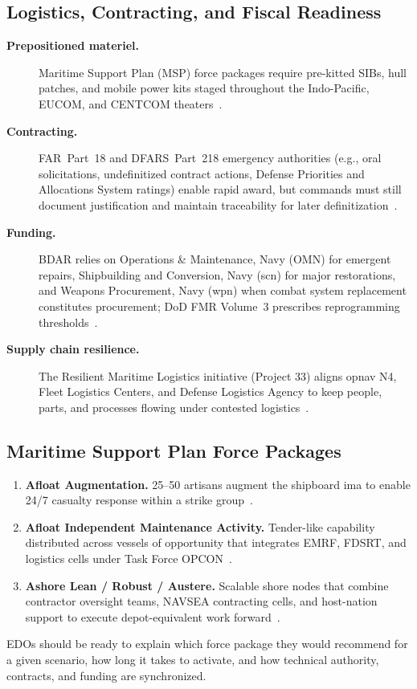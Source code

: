 \documentclass[../main.tex]{subfiles}
\begin{document}
\subsection{Logistics, Contracting, and Fiscal Readiness}
\begin{description}
\item[\textbf{Prepositioned materiel.}] Maritime Support Plan (MSP) force packages require pre-kitted SIBs, hull patches, and mobile power kits staged throughout the Indo-Pacific, EUCOM, and CENTCOM theaters~\autocite{CPF-MSP-PLANORD-2023}.
\item[\textbf{Contracting.}] FAR~Part~18 and DFARS~Part~218 emergency authorities (e.g., oral solicitations, undefinitized contract actions, Defense Priorities and Allocations System ratings) enable rapid award, but commands must still document justification and maintain traceability for later definitization~\autocite{FAR,DFARS}.
\item[\textbf{Funding.}] BDAR relies on Operations \& Maintenance, Navy (OMN) for emergent repairs, Shipbuilding and Conversion, Navy (\ac{scn}) for major restorations, and Weapons Procurement, Navy (\ac{wpn}) when combat system replacement constitutes procurement; DoD FMR Volume~3 prescribes reprogramming thresholds~\autocite{DoDFMR-Vol3}.
\item[\textbf{Supply chain resilience.}] The Resilient Maritime Logistics initiative (Project 33) aligns \ac{opnav} N4, Fleet Logistics Centers, and Defense Logistics Agency to keep people, parts, and processes flowing under contested logistics~\autocite{NAVPLAN2024,edo-4-1-6-bdar-2025}.
\end{description}

\subsection{Maritime Support Plan Force Packages}
\begin{enumerate}
\item \textbf{Afloat Augmentation.} 25--50 artisans augment the shipboard \ac{ima} to enable 24/7 casualty response within a strike group~\autocite{CPF-MSP-PLANORD-2023}.
\item \textbf{Afloat Independent Maintenance Activity.} Tender-like capability distributed across vessels of opportunity that integrates EMRF, FDSRT, and logistics cells under Task Force OPCON~\autocite{CPF-MSP-PLANORD-2023}.
\item \textbf{Ashore Lean / Robust / Austere.} Scalable shore nodes that combine contractor oversight teams, NAVSEA contracting cells, and host-nation support to execute depot-equivalent work forward~\autocite{CPF-MSP-PLANORD-2023}.
\end{enumerate}
EDOs should be ready to explain which force package they would recommend for a given scenario, how long it takes to activate, and how technical authority, contracts, and funding are synchronized.

\end{document}
